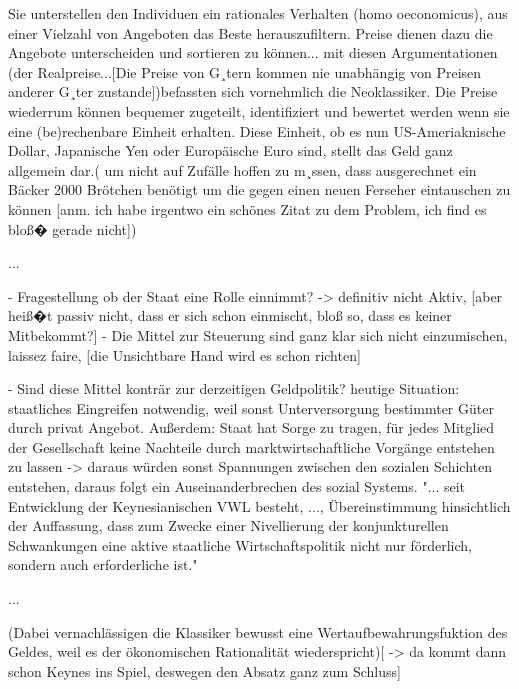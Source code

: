 \documentclass[
onecolumn,
a4paper,
abstracton,
parskip=half
,final
]{scrartcl}
\begin{document}
Sie unterstellen den Individuen ein rationales Verhalten (homo oeconomicus), aus einer
 Vielzahl von Angeboten das Beste herauszufiltern. Preise dienen dazu die Angebote
unterscheiden und sortieren zu k{\"o}nnen... mit diesen Argumentationen  (der Realpreise...[Die
Preise von G¸tern kommen nie unabh{\"a}ngig von Preisen anderer G¸ter zustande])befassten sich
vornehmlich die Neoklassiker. Die Preise wiederrum k{\"o}nnen bequemer zugeteilt,
identifiziert und bewertet werden wenn sie eine (be)rechenbare Einheit erhalten.
Diese Einheit, ob es nun US-Ameriaknische Dollar, Japanische Yen oder Europ{\"a}ische Euro
sind, stellt das Geld ganz allgemein dar.( um nicht auf Zuf{\"a}lle hoffen zu m¸ssen, dass
ausgerechnet ein B{\"a}cker 2000 Br{\"o}tchen ben{\"o}tigt um die gegen einen neuen Ferseher eintauschen
zu k{\"o}nnen [anm. ich habe irgentwo ein sch{\"o}nes Zitat zu dem Problem, ich find es blo{\ss}� gerade
nicht])

...

- Fragestellung ob der Staat eine Rolle einnimmt? -> definitiv nicht Aktiv,
[aber hei{\ss}�t passiv nicht, dass er sich schon einmischt, blo{\ss} so, dass es keiner Mitbekommt?]
- Die Mittel zur Steuerung sind ganz klar sich nicht einzumischen, laissez faire,
[die Unsichtbare Hand wird es schon richten]


- Sind diese Mittel kontr{\"a}r zur derzeitigen Geldpolitik?
heutige Situation: staatliches Eingreifen notwendig, weil sonst Unterversorgung bestimmter
G{\"u}ter durch privat Angebot. Au{\ss}erdem: Staat hat Sorge zu tragen, f{\"u}r jedes Mitglied der
Gesellschaft keine Nachteile durch marktwirtschaftliche Vorg{\"a}nge entstehen zu lassen -> daraus
w{\"u}rden sonst Spannungen zwischen den sozialen Schichten entstehen, daraus folgt ein
Auseinanderbrechen des sozial Systems. "... seit Entwicklung der Keynesianischen VWL besteht,
..., {\"U}bereinstimmung hinsichtlich der Auffassung, dass zum Zwecke einer Nivellierung der
konjunkturellen Schwankungen eine aktive staatliche Wirtschaftspolitik nicht nur f{\"o}rderlich,
 sondern auch erforderliche ist."

...

(Dabei vernachl{\"a}ssigen die Klassiker bewusst eine Wertaufbewahrungsfuktion des Geldes, weil es
der {\"o}konomischen Rationalit{\"a}t wiederspricht)[ -> da kommt dann schon Keynes ins Spiel, deswegen
den Absatz ganz zum Schluss]


\end{document}
